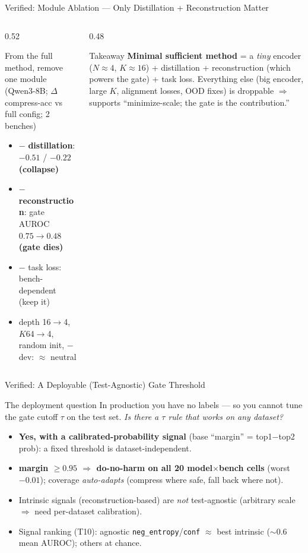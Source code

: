 \begin{frame}{Verified: Module Ablation --- Only Distillation + Reconstruction Matter}
  \small
  \begin{columns}[T]
    \begin{column}{0.52\textwidth}
      \begin{block}{From the full method, remove one module}
        \scriptsize (Qwen3-8B; $\Delta$compress-acc vs full config; 2 benches)
        \begin{itemize}\scriptsize
          \item $-$ \textbf{distillation}: $-0.51$ / $-0.22$ \;\textbf{(collapse)}
          \item $-$ \textbf{reconstruction}: gate AUROC $0.75\!\to\!0.48$ \;\textbf{(gate dies)}
          \item $-$ task loss: bench-dependent (keep it)
          \item depth 16$\to$4, $K$64$\to$4, random init, $-$dev: $\approx$ neutral
        \end{itemize}
      \end{block}
    \end{column}
    \begin{column}{0.48\textwidth}
      \begin{block}{Takeaway}
        \scriptsize \textbf{Minimal sufficient method} = a \emph{tiny} encoder ($N\!\approx\!4$, $K\!\approx\!16$) + distillation +
        reconstruction (which powers the gate) + task loss. Everything else (big encoder, large $K$, alignment
        losses, OOD fixes) is droppable $\Rightarrow$ supports ``minimize-scale; the gate is the contribution.''
      \end{block}
    \end{column}
  \end{columns}
\end{frame}

\begin{frame}{Verified: A Deployable (Test-Agnostic) Gate Threshold}
  \small
  \begin{block}{The deployment question}
    In production you have no labels --- so you cannot tune the gate cutoff $\tau$ on the test set. \emph{Is there a $\tau$ rule that works on any dataset?}
  \end{block}
  \begin{itemize}
    \item \textbf{Yes, with a calibrated-probability signal} (base ``margin'' = top1$-$top2 prob): a fixed threshold is dataset-independent.
    \item \textbf{margin $\ge 0.95$ $\Rightarrow$ do-no-harm on all 20 model$\times$bench cells} (worst $-0.01$); coverage \emph{auto-adapts} (compress where safe, fall back where not).
    \item Intrinsic signals (reconstruction-based) are \emph{not} test-agnostic (arbitrary scale $\Rightarrow$ need per-dataset calibration).
    \item Signal ranking (T10): agnostic \texttt{neg\_entropy}/\texttt{conf} $\approx$ best intrinsic ($\sim$0.6 mean AUROC); others at chance.
  \end{itemize}
\end{frame}

